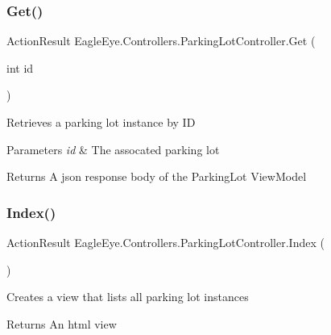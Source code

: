 \subsubsection{\texorpdfstring{Get()}{Get()}}
{\footnotesize\ttfamily Action\+Result Eagle\+Eye.\+Controllers.\+Parking\+Lot\+Controller.\+Get (\begin{DoxyParamCaption}\item[{int}]{id }\end{DoxyParamCaption})}



Retrieves a parking lot instance by ID 


\begin{DoxyParams}{Parameters}
{\em id} & The assocated parking lot\\
\hline
\end{DoxyParams}
\begin{DoxyReturn}{Returns}
A json response body of the Parking\+Lot View\+Model
\end{DoxyReturn}
\mbox{\label{class_eagle_eye_1_1_controllers_1_1_parking_lot_controller_a5015c903ed00613edaec0fed1c2d4847}} 
\subsubsection{\texorpdfstring{Index()}{Index()}}
{\footnotesize\ttfamily Action\+Result Eagle\+Eye.\+Controllers.\+Parking\+Lot\+Controller.\+Index (\begin{DoxyParamCaption}{ }\end{DoxyParamCaption})}



Creates a view that lists all parking lot instances 

\begin{DoxyReturn}{Returns}
An html view
\end{DoxyReturn}
\mbox{\label{class_eagle_eye_1_1_controllers_1_1_parking_lot_controller_a3e05e24a69a4c1c646c67003a00b632b}} 
